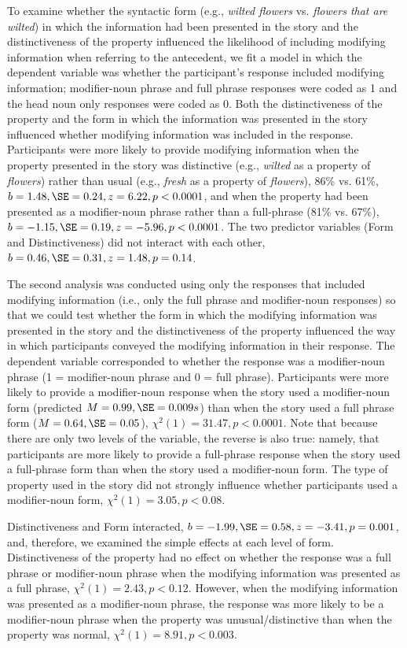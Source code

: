 \documentclass[output=paper]{langsci/langscibook}
\begin{document}
To examine whether the syntactic form (e.g., \textit{wilted flowers}
vs. \textit{flowers that are wilted}) in which the information had
been presented in the story and the distinctiveness of the property
influenced the likelihood of including modifying information when
referring to the antecedent, we fit a model in which the dependent
variable was whether the participant’s response included modifying
information; modifier-noun phrase and full phrase responses were coded
as 1 and the head noun only responses were coded as 0. Both the
distinctiveness of the property and the form in which the information
was presented in the story influenced whether modifying information
was included in the response. Participants were more likely to provide
modifying information when the property presented in the story was
distinctive (e.g., \textit{wilted} as a property of \textit{flowers})
rather than usual (e.g., \textit{fresh} as a property of
\textit{flowers}), 86\% vs. 61\%, $b=1.48, \SE=0.24, z=6.22, p<0.0001$, and
when the property had been presented as a modifier-noun phrase rather
than a full-phrase (81\% vs. 67\%), $b=-1.15, \SE=0.19, z=-5.96,
p<0.0001$. The two predictor variables (Form and Distinctiveness) did
not interact with each other, $b=0.46, \SE=0.31, z=1.48, p=0.14$.

The second analysis was conducted using only the responses that
included modifying information (i.e., only the full phrase and
modifier-noun responses) so that we could test whether the form in
which the modifying information was presented in the story and the
distinctiveness of the property influenced the way in which
participants conveyed the modifying information in their response. The
dependent variable corresponded to whether the response was a
modifier-noun phrase (1 = modifier-noun phrase and 0 = full
phrase). Participants were more likely to provide a modifier-noun
response when the story used a modifier-noun form (predicted $M=0.99,
\SE=0.009s$) than when the story used a full phrase form ($M=0.64, \SE=0.05$),
$\chi^2(1)=31.47, p<0.0001$. Note that because there are only two
levels of the variable, the reverse is also true: namely, that
participants are more likely to provide a full-phrase response when
the story used a full-phrase form than when the story used a
modifier-noun form. The type of property used in the story did not
strongly influence whether participants used a modifier-noun form,
$\chi^2(1)=3.05, p<0.08$.

Distinctiveness and Form interacted, $b=-1.99, \SE=0.58, z=-3.41, p=0.001$,
and, therefore, we examined the simple effects at each level of
form. Distinctiveness of the property had no effect on whether the
response was a full phrase or modifier-noun phrase when the modifying
information was presented as a full phrase, $\chi^2(1)=2.43,
p<0.12$. However, when the modifying information was presented as a
modifier-noun phrase, the response was more likely to be a
modifier-noun phrase when the property was unusual/distinctive than
when the property was normal, $\chi^2(1)=8.91, p<0.003$.
\end{document}
